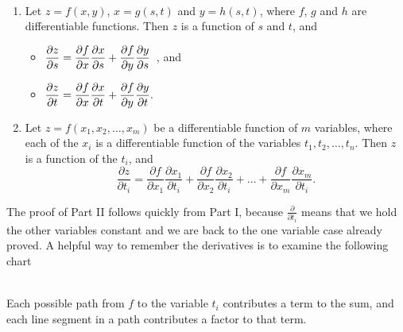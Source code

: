 \begin{theorem}\label{thm:multi_chain2}%
%
\mbox{}\\[-2\baselineskip]\parbox[t]{\linewidth}{%
\begin{enumerate}
	\item Let $z=f(x,y)$, $x=g(s,t)$ and $y=h(s,t)$, where $f$, $g$ and $h$ are differentiable functions. Then $z$ is a function of $s$ and $t$, and
	\begin{itemize}
		\item $\displaystyle \frac{\partial z}{\partial s} = \frac{\partial f}{\partial x}\frac{\partial x}{\partial s} + \frac{\partial f}{\partial y}\frac{\partial y}{\partial s}$\ , \quad and 
		\item $\displaystyle \frac{\partial z}{\partial t} = \frac{\partial f}{\partial x}\frac{\partial x}{\partial t} + \frac{\partial f}{\partial y}\frac{\partial y}{\partial t}.$
	\end{itemize}
		
	\item Let $z = f(x_1,x_2,\dots,x_m)$ be a differentiable function of $m$ variables, where each of the $x_i$ is a differentiable function of the variables $t_1,t_2,\dots,t_n$. Then $z$ is a function of the $t_i$, and 
	\[\frac{\partial z}{\partial t_i} = \frac{\partial f}{\partial x_1}\frac{\partial x_1}{\partial t_i} + \frac{\partial f}{\partial x_2}\frac{\partial x_2}{\partial t_i} + \dots +  \frac{\partial f}{\partial x_m}\frac{\partial x_m}{\partial t_i}.\]
\end{enumerate}}
\end{theorem}

The proof of Part II follows quickly from Part I, because $\frac\partial{\partial t_i}$ means that we hold the other variables constant and we are back to the one variable case already proved.  A helpful way to remember the derivatives is to examine the following chart\\
\noindent\begin{minipage}[t]{\linewidth}\noindent%
\captionsetup{type=figure}%
\centering
{}\tagstructend
\end{minipage}\\
Each possible path from $f$ to the variable $t_i$ contributes a term to the sum, and each line segment in a path contributes a factor to that term.

